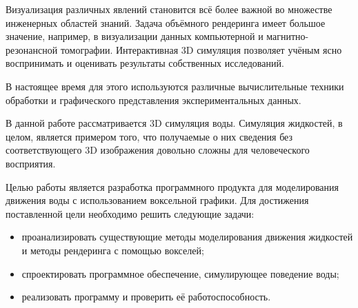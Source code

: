 \Introduction

Визуализация различных явлений становится всё более важной во множестве инженерных
областей знаний.
Задача объёмного рендеринга имеет большое значение, например, в визуализации данных
компьютерной и магнитно-резонансной томографии\cite{book:ash}.
Интерактивная 3D симуляция позволяет учёным ясно воспринимать и
оценивать результаты собственных исследований.

В настоящее время для этого используются различные вычислительные техники обработки
 и графического представления экспериментальных данных\cite{book:physical}.

В данной работе рассматривается 3D симуляция воды. Симуляция жидкостей, в целом,
является примером того, что получаемые о них сведения без соответствующего 3D изображения
довольно сложны для человеческого восприятия.


Целью работы является разработка программного продукта для моделирования движения воды с использованием воксельной графики. Для достижения поставленной цели необходимо решить следующие задачи:

\begin{itemize}
\item проанализировать существующие методы моделирования движения жидкостей и методы рендеринга с помощью вокселей;
\item спроектировать программное обеспечение, симулирующее поведение воды;
\item реализовать программу и проверить её работоспособность.
\end{itemize}
